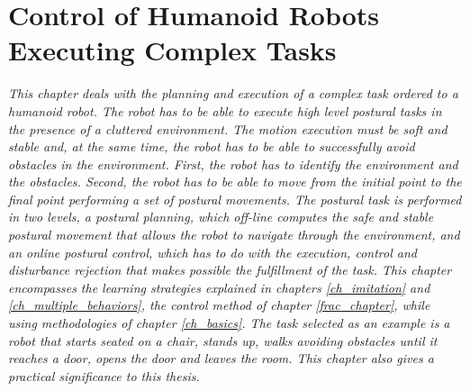 \chapter{Control of Humanoid Robots Executing Complex Tasks}\label{ch_postural_control}
\textit{This chapter deals with the planning and execution of a complex task ordered to a humanoid robot. The robot has to be able to execute high level postural tasks in the presence of a cluttered environment. The motion execution must be soft and stable and, at the same time, the robot has to be able to successfully avoid obstacles in the environment. First, the robot has to identify the environment and the obstacles. Second, the robot has to be able to move from the initial point to the final point performing a set of postural movements. The postural task is performed in two levels, a postural planning, which off-line computes  the  safe and stable postural movement that allows the robot to  navigate through the environment, and an online postural control, which has to do with the execution, control and disturbance rejection that makes possible the fulfillment of the task. This chapter encompasses the learning strategies explained in chapters \ref{ch_imitation} and \ref{ch_multiple_behaviors}, the control method of chapter \ref{frac_chapter}, while using methodologies of chapter \ref{ch_basics}. The task selected as an example is a robot that starts seated on a chair, stands up, walks avoiding obstacles until it reaches a door, opens the door and leaves the room. This chapter also gives a practical significance to this thesis. }
\newpage

%
%
%
%
%
%
